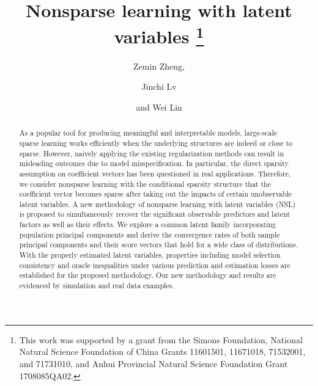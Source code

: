 \documentclass{statsoc}
\title[NSL]
{Nonsparse learning with latent variables
\thanks{This work was supported by a grant from the Simons Foundation,  National Natural Science Foundation of China Grants 11601501, 11671018, 71532001, and 71731010, and Anhui Provincial Natural Science Foundation Grant 1708085QA02.}%
}
\author{Zemin Zheng,}
\author{Jinchi Lv}
\author[Z. Zheng, J. Lv and W. Lin]{and Wei Lin}
\begin{document}
\begin{abstract}
As a popular tool for producing meaningful and interpretable models, large-scale sparse learning works efficiently when the underlying structures are indeed or close to sparse. However, naively applying the existing regularization methods can result in misleading outcomes due to model misspecification. In particular, the direct sparsity assumption on coefficient vectors has been questioned in real applications. Therefore, we consider nonsparse learning with the conditional sparsity structure that the coefficient vector becomes sparse after taking out the impacts of certain unobservable latent variables. A new methodology of nonsparse learning with latent variables (NSL) is proposed to simultaneously recover the significant observable predictors and latent factors as well as their effects. We explore a common latent family incorporating population principal components and derive the convergence rates of both sample principal components and their score vectors that hold for a wide class of distributions. With the properly estimated latent variables, properties including model selection consistency and oracle inequalities under various prediction and estimation losses are established for the proposed methodology. Our new methodology and results are evidenced by simulation and real data examples.


\end{abstract}
\end{document}
